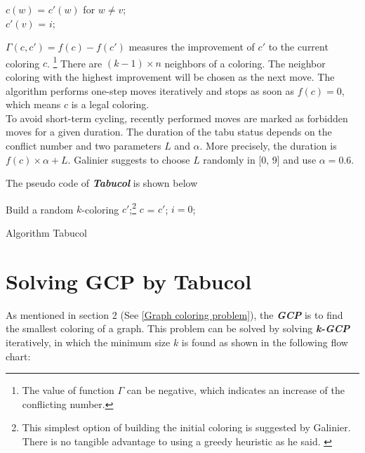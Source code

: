 \documentclass[12pt,a4paper,twoside]{scrartcl}
\numberwithin{equation}{section}
\begin{document}
$c(w)$ = $c'(w)$ for $w \neq v$;\\
$c'(v)$ = $i$;


$\Gamma(c,c') = f(c)-f(c')$ measures the improvement of $c'$ to the current coloring $c$. \footnote{The value of function $\Gamma$ can be negative, which indicates an increase of the conflicting number.} There are $(k-1)\times n$ neighbors of a coloring. The neighbor coloring with the highest improvement will be chosen as the next move. The algorithm performs one-step moves iteratively and stops as soon as $f(c)= 0$, which means $c$ is a legal coloring.\\
To avoid short-term cycling, recently performed moves are marked as forbidden moves for a given duration. The duration of the tabu status depends on the conflict number and two parameters $L$ and $\alpha$. More precisely, the duration is $f(c)\times \alpha +L$. Galinier suggests to choose $L$ randomly in [0, 9] and use $\alpha = 0.6$. \cite{galinier1999hybrid}

The pseudo code of \emph{\textbf{Tabucol}} is shown below

\begin{algorithm}[H]
 Build a random $k$-coloring $c'$;\footnote{This simplest option of building the initial coloring is suggested by Galinier. There is no tangible advantage to using a greedy heuristic as he said. \cite{galinier2006survey}} \;
 $c$ = $c'$;\;
 $i = 0$;\;
 \caption{Algorithm Tabucol}
\end{algorithm}

\clearpage


\section{Solving GCP by Tabucol}
\label{sec:Solving GCP by Tabucol}
As mentioned in section 2 (See \ref{Graph coloring problem}), the \emph{\textbf{GCP}} is to find the smallest coloring of a graph. This problem can be solved by solving \emph{\textbf{k-GCP}} iteratively, in which the minimum size  $k$ is found as shown in the following flow chart:
\end{document}
